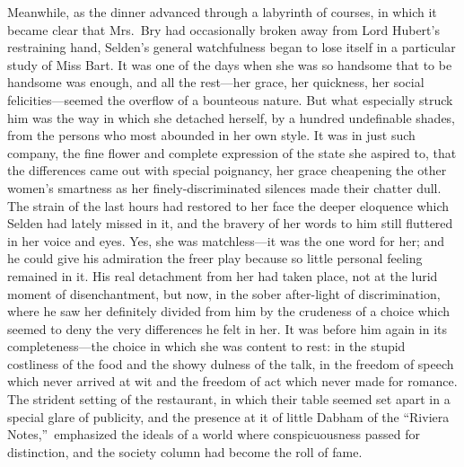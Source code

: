\documentclass[12pt,a4paper]{book}
\begin{document}
Meanwhile, as the dinner advanced through a labyrinth of courses,
in which it became clear that Mrs.\ Bry had occasionally broken
away from Lord Hubert's restraining hand, Selden's general
watchfulness began to lose itself in a particular study of Miss
Bart. It was one of the days when she was so handsome
that to be handsome was enough, and all the rest---her grace, her
quickness, her social felicities---seemed the overflow of a
bounteous nature. But what especially struck him was the way in
which she detached herself, by a hundred undefinable shades, from
the persons who most abounded in her own style. It was in just
such company, the fine flower and complete expression of the
state she aspired to, that the differences came out with special
poignancy, her grace cheapening the other women's smartness as
her finely-discriminated silences made their chatter dull. The
strain of the last hours had restored to her face the deeper
eloquence which Selden had lately missed in it, and the bravery
of her words to him still fluttered in her voice and eyes. Yes,
she was matchless---it was the one word for her; and he could give
his admiration the freer play because so little personal feeling
remained in it. His real detachment from her had taken place, not
at the lurid moment of disenchantment, but now, in the sober
after-light of discrimination, where he saw her definitely
divided from him by the crudeness of a choice which seemed to
deny the very differences he felt in her. It was before him again
in its completeness---the choice in which she was content to rest: 
in the stupid costliness of the food and the showy dulness of the
talk, in the freedom of speech which never arrived at wit and the
freedom of act which never made for romance. The strident setting
of the restaurant, in which their table seemed set apart in a
special glare of publicity, and the presence at it of little
Dabham of the ``Riviera Notes,''\ emphasized the ideals of a world
where conspicuousness passed for distinction, and the society
column had become the roll of fame.
\end{document}
